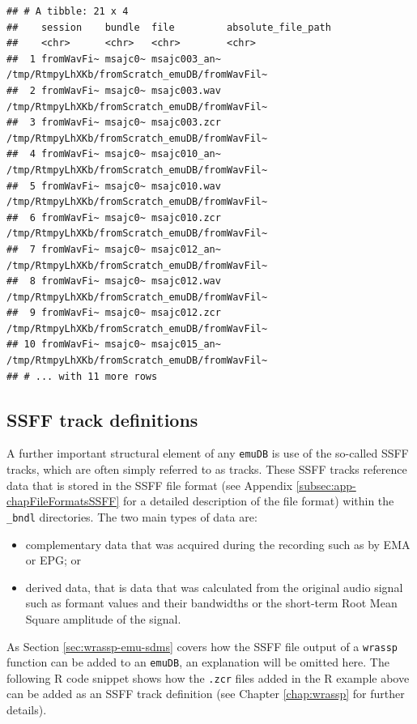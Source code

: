 \documentclass[]{book}
\providecommand{\tightlist}{%
  \setlength{\itemsep}{0pt}\setlength{\parskip}{0pt}}
\begin{document}
\begin{verbatim}
## # A tibble: 21 x 4
##    session    bundle  file         absolute_file_path                           
##    <chr>      <chr>   <chr>        <chr>                                        
##  1 fromWavFi~ msajc0~ msajc003_an~ /tmp/RtmpyLhXKb/fromScratch_emuDB/fromWavFil~
##  2 fromWavFi~ msajc0~ msajc003.wav /tmp/RtmpyLhXKb/fromScratch_emuDB/fromWavFil~
##  3 fromWavFi~ msajc0~ msajc003.zcr /tmp/RtmpyLhXKb/fromScratch_emuDB/fromWavFil~
##  4 fromWavFi~ msajc0~ msajc010_an~ /tmp/RtmpyLhXKb/fromScratch_emuDB/fromWavFil~
##  5 fromWavFi~ msajc0~ msajc010.wav /tmp/RtmpyLhXKb/fromScratch_emuDB/fromWavFil~
##  6 fromWavFi~ msajc0~ msajc010.zcr /tmp/RtmpyLhXKb/fromScratch_emuDB/fromWavFil~
##  7 fromWavFi~ msajc0~ msajc012_an~ /tmp/RtmpyLhXKb/fromScratch_emuDB/fromWavFil~
##  8 fromWavFi~ msajc0~ msajc012.wav /tmp/RtmpyLhXKb/fromScratch_emuDB/fromWavFil~
##  9 fromWavFi~ msajc0~ msajc012.zcr /tmp/RtmpyLhXKb/fromScratch_emuDB/fromWavFil~
## 10 fromWavFi~ msajc0~ msajc015_an~ /tmp/RtmpyLhXKb/fromScratch_emuDB/fromWavFil~
## # ... with 11 more rows
\end{verbatim}

\hypertarget{ssff-track-definitions}{%
\subsection{SSFF track definitions}\label{ssff-track-definitions}}

A further important structural element of any \texttt{emuDB} is use of the so-called SSFF tracks, which are often simply referred to as tracks. These SSFF tracks reference data that is stored in the SSFF file format (see Appendix \ref{subsec:app-chapFileFormatsSSFF} for a detailed description of the file format) within the \texttt{\_bndl} directories. The two main types of data are:

\begin{itemize}
\tightlist
\item
  complementary data that was acquired during the recording such as by EMA or EPG; or
\item
  derived data, that is data that was calculated from the original audio signal such as formant values and their bandwidths or the short-term Root Mean Square amplitude of the signal.
\end{itemize}

As Section \ref{sec:wrassp-emu-sdms} covers how the SSFF file output of a \texttt{wrassp} function can be added to an \texttt{emuDB}, an explanation will be omitted here. The following R code snippet shows how the \texttt{.zcr} files added in the R example above can be added as an SSFF track definition (see Chapter \ref{chap:wrassp} for further details).
\end{document}
